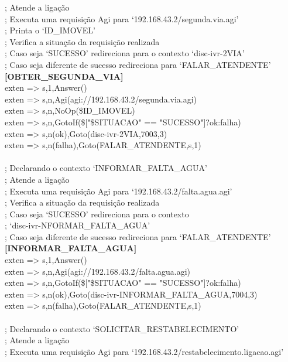 \begin{anexosenv}
; Atende a ligação \\
; Executa uma requisição Agi para ‘192.168.43.2/segunda.via.agi’ \\
; Printa o ‘ID\_IMOVEL’ \\
; Verifica a situação da requisição realizada \\
; Caso seja ‘SUCESSO’ redireciona para o contexto ‘disc-ivr-2VIA’ \\
; Caso seja diferente de sucesso redireciona para ‘FALAR\_ATENDENTE’ \\
\textbf{[OBTER\_SEGUNDA\_VIA]} \\
exten => s,1,Answer() \\
exten => s,n,Agi(agi://192.168.43.2/segunda.via.agi) \\
exten => s,n,NoOp(\${ID\_IMOVEL}) \\
exten => s,n,GotoIf(\$["\${SITUACAO}" == "SUCESSO"]?ok:falha) \\
exten => s,n(ok),Goto(disc-ivr-2VIA,7003,3) \\
exten => s,n(falha),Goto(FALAR\_ATENDENTE,s,1) \\
\\
; Declarando o contexto ‘INFORMAR\_FALTA\_AGUA’ \\
; Atende a ligação \\
; Executa uma requisição Agi para ‘192.168.43.2/falta.agua.agi’ \\
; Verifica a situação da requisição realizada \\
; Caso seja ‘SUCESSO’ redireciona para o contexto \\
; ‘disc-ivr-NFORMAR\_FALTA\_AGUA’ \\
; Caso seja diferente de sucesso redireciona para ‘FALAR\_ATENDENTE’ \\
\textbf{[INFORMAR\_FALTA\_AGUA]} \\
exten => s,1,Answer() \\
exten => s,n,Agi(agi://192.168.43.2/falta.agua.agi) \\
exten => s,n,GotoIf(\$["\${SITUACAO}" == "SUCESSO"]?ok:falha) \\
exten => s,n(ok),Goto(disc-ivr-INFORMAR\_FALTA\_AGUA,7004,3) \\
exten => s,n(falha),Goto(FALAR\_ATENDENTE,s,1) \\
 \\
; Declarando o contexto ‘SOLICITAR\_RESTABELECIMENTO’ \\
; Atende a ligação \\
; Executa uma requisição Agi para ‘192.168.43.2/restabelecimento.ligacao.agi’ \\

\end{anexosenv}
